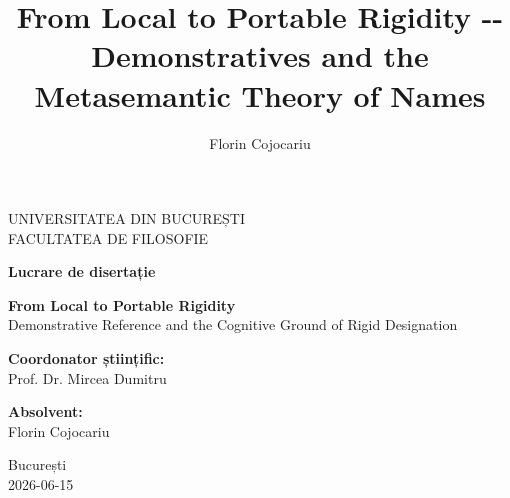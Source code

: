 \documentclass[12pt,a4paper]{article}
\title{From Local to Portable Rigidity -\/- Demonstratives and the Metasemantic Theory of Names}
\author{Florin Cojocariu}
\date{}
\begin{document}
\pagestyle{empty}

\begin{center}
\vspace*{0.5cm}
{\large UNIVERSITATEA DIN BUCUREȘTI}\\[0.3em]
{\large FACULTATEA DE FILOSOFIE}

\vfill

{\large\bfseries Lucrare de disertație}

\vspace{2em}

{\LARGE\bfseries From Local to Portable Rigidity}\\[1em]
{\Large Demonstrative Reference and the Cognitive Ground of Rigid Designation}

\vfill
\end{center}
\noindent
\begin{minipage}[t]{0.45\textwidth}
\raggedright
\textbf{Coordonator științific:}\\
Prof. Dr. Mircea Dumitru
\end{minipage}%
\hfill
\begin{minipage}[t]{0.45\textwidth}
\raggedleft
\textbf{Absolvent:}\\
Florin Cojocariu
\end{minipage}
\vspace{1.5cm}
\begin{center}
{\large București}\\[0.3em]
{\large 2026-06-15}
\end{center}
\clearpage


\setcounter{tocdepth}{3}
\tableofcontents
\thispagestyle{empty}
\clearpage
\end{document}

